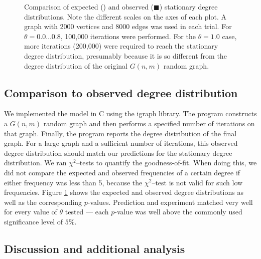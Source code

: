 \documentclass[a4paper,10pt]{article}
\begin{document}
\begin{figure}
  \caption{Comparison of expected (\color{blue}{\textbullet}\color{black}) and observed (\tiny\color{mygreen}$\blacksquare$\color{black}\normalsize) stationary degree distributions. Note the different scales on the axes of each plot. A graph with 2000 vertices and 8000 edges was used in each trial. For $\theta = 0.0 \ldots 0.8$, 100,000 iterations were performed. For the $\theta=1.0$ case, more iterations (200,000) were required to reach the stationary degree distribution, presumably because it is so different from the degree distribution of the original $G(n,m)$ random graph.}
  \label{fig:dd}
\end{figure}

\subsection{Comparison to observed degree distribution} 
We implemented the model in C using the igraph library. The program constructs a $G(n, m)$ random graph and then performs a specified number of iterations on that graph. Finally, the program reports the degree distribution of the final graph. For a large graph and a sufficient number of iterations, this observed degree distribution should match our predictions for the stationary degree distribution. We ran $\chi^2$--tests to quantify the goodness-of-fit. When doing this, we did not compare the expected and observed frequencies of a certain degree if either frequency was less than 5, because the $\chi^2$--test is not valid for such low frequencies. Figure \ref{fig:dd} shows the expected and observed degree distributions as well as the corresponding $p$-values. Prediction and experiment matched very well for every value of $\theta$ tested --- each $p$-value was well above the commonly used significance level of $5\%$.

\subsection{Discussion and additional analysis}
\end{document}
